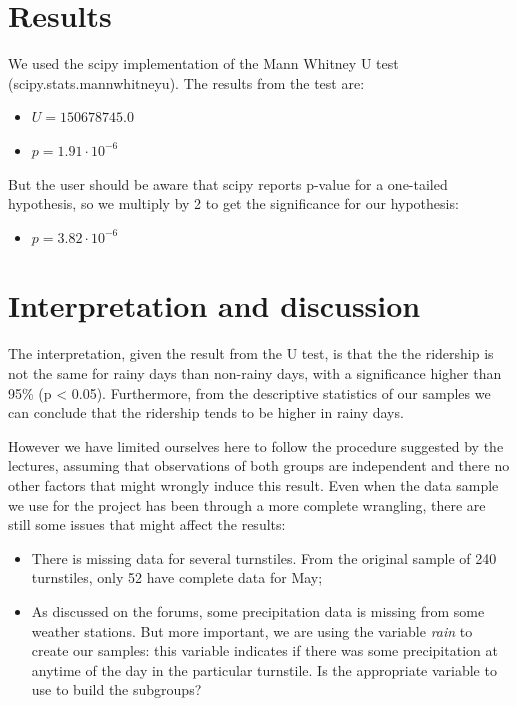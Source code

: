 \documentclass[letterpaper,10pt,english]{sphinxmanual}
\begin{document}
\section{Results}
\label{section1:results}
We used the scipy implementation of the Mann Whitney U test
(scipy.stats.mannwhitneyu). The results from the test are:
\begin{itemize}
\item {} 
\(U = 150678745.0\)

\item {} 
\(p = 1.91 \cdot 10^{-6}\)

\end{itemize}

But the user should be aware that scipy reports p-value for a one-tailed
hypothesis, so we multiply by 2 to get the significance for our hypothesis:
\begin{itemize}
\item {} 
\(p = 3.82 \cdot 10^{-6}\)

\end{itemize}


\section{Interpretation and discussion}
\label{section1:interpretation-and-discussion}
The interpretation, given the result from the U test, is that the the ridership
is not the same for rainy days than non-rainy days, with a significance higher
than 95\% (p \textless{} 0.05). Furthermore, from the descriptive statistics of our samples
we can conclude that the ridership tends to be higher in rainy days.

However we have limited ourselves here to follow the procedure suggested by the
lectures, assuming that observations of both groups are independent and there
no other factors that might wrongly induce this result. Even when the data sample
we use for the project has been through a more complete wrangling, there are
still some issues that might affect the results:
\begin{itemize}
\item {} 
There is missing data for several turnstiles. From the original sample of 240
turnstiles, only 52 have complete data for May;

\item {} 
As discussed on the forums, some precipitation data is missing from some weather
stations. But more important, we are using the variable \emph{rain} to create our samples:
this variable indicates if there was some precipitation at anytime of the day in the
particular turnstile. Is the appropriate variable to use to build the subgroups?

\end{itemize}
\end{document}

